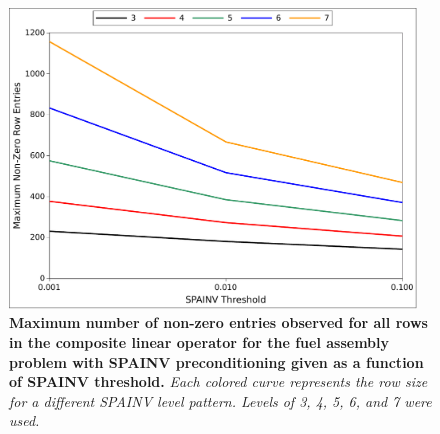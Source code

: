 \begin{figure}[t!]
  \begin{center}
    \includegraphics[width=4.25in]{chapters/spn_equations/spainv_size.pdf}
  \end{center}
  \caption{\textbf{Maximum number of non-zero entries observed for all
      rows in the composite linear operator for the fuel assembly
      problem with SPAINV preconditioning given as a function of
      SPAINV threshold.} \textit{Each colored curve represents the row
      size for a different SPAINV level pattern. Levels of 3, 4, 5, 6,
      and 7 were used.}}
  \label{fig:spainv_size}
\end{figure}

